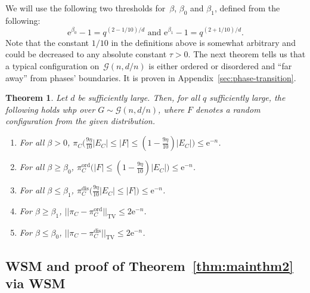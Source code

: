 \documentclass[11pt]{article}
\theoremstyle{plain}
\newtheorem{theorem}{Theorem}
\newcommand{\G}{\mathcal{G}}
\newcommand{\emm}{\mathrm{e}}
\newcommand{\TV}{\mathrm{TV}}
\newcommand{\1}{\mathbb{1}}
\newcommand{\ord}{\mathrm{ord}}
\newcommand{\dis}{\mathrm{dis}}
\begin{document}
We will use the following two   thresholds for~$\beta$, \(\beta_0\) and \(\beta_1\), defined from the following: 
\begin{equation}\label{eq:beta0beta1}
    \emm^{\beta_0} - 1 = q^{(2-1/10)/d} \mbox{ and $\emm^{\beta_1}-1 = q^{(2+1/10)/d}$}.
\end{equation}
Note that the constant \(1/10\) in the definitions above is somewhat arbitrary and could be decreased to any absolute constant \(\tau>0\). The next theorem tells us that a typical configuration on~\(\G(n,d/n)\) is either ordered or disordered and ``far away'' from phases' boundaries. It is proven in Appendix~\ref{sec:phase-transition}.

\begin{theorem}\label{thm:phase-transition}
Let $d$ be sufficiently large. Then, for all $q$ sufficiently large, the following holds whp over \(G\sim \G(n,d/n)\), where $F$ denotes a random configuration from the given distribution.
    \begin{enumerate}[(1)]
        \item For all \(\beta > 0\), \(\pi_C\Big(\tfrac{9\eta}{10}|E_C| \leq |F| \leq (1-\tfrac{9\eta}{10})|E_C|\Big) \leq \emm^{-n} \).
        \item For all \(\beta\geq \beta_0\), \(\pi_C^\ord\Big(|F| \leq (1-\tfrac{9\eta}{10})|E_C|\Big) \leq \emm^{-n} \).
        \item For all \(\beta\leq \beta_1\), \(\pi_C^\dis\Big(\tfrac{9\eta}{10}|E_C| \leq |F|\Big) \leq \emm^{-n}\).
        
        \item For \(\beta \geq \beta_1\), \(||\pi_C - \pi^\ord_C||_\TV \leq 2\emm^{-n}\).
        \item For \(\beta \leq \beta_0\), \(||\pi_C - \pi^\dis_C||_\TV \leq 2\emm^{-n}\).
    \end{enumerate}
\end{theorem}


\subsection{WSM and proof of Theorem~\ref{thm:mainthm2} via WSM}\label{sec:proofThm2}
\end{document}
